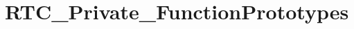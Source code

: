 \hypertarget{group___r_t_c___private___function_prototypes}{}\section{R\+T\+C\+\_\+\+Private\+\_\+\+Function\+Prototypes}
\label{group___r_t_c___private___function_prototypes}
